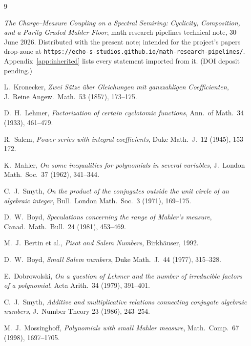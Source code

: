 \documentclass[11pt]{article}
\theoremstyle{plain}
\theoremstyle{definition}
\theoremstyle{remark}
\begin{document}
\begin{thebibliography}{9}

 \emph{The Charge--Measure Coupling on a Spectral Semiring:
Cyclicity, Composition, and a Parity-Graded Mahler Floor},
math-research-pipelines technical note, 30 June 2026. Distributed with the
present note; intended for the project's papers drop-zone at
\texttt{https://echo-s-studios.github.io/math-research-pipelines/}.
Appendix~\ref{app:inherited} lists every statement imported from it. (DOI
deposit pending.)

 L.~Kronecker, \emph{Zwei S\"atze \"uber Gleichungen mit
ganzzahligen Coefficienten}, J.~Reine Angew.~Math.\ 53 (1857), 173--175.

 D.~H.~Lehmer, \emph{Factorization of certain cyclotomic
functions}, Ann.\ of Math.\ 34 (1933), 461--479.

 R.~Salem, \emph{Power series with integral coefficients},
Duke Math.~J.\ 12 (1945), 153--172.

 K.~Mahler, \emph{On some inequalities for polynomials in
several variables}, J.~London Math.~Soc.\ 37 (1962), 341--344.

 C.~J.~Smyth, \emph{On the product of the conjugates outside the
unit circle of an algebraic integer}, Bull.~London Math.~Soc.\ 3 (1971),
169--175.

 D.~W.~Boyd, \emph{Speculations concerning the range of Mahler's
measure}, Canad.~Math.~Bull.\ 24 (1981), 453--469.

 M.~J.~Bertin et al., \emph{Pisot and Salem Numbers},
Birkh\"auser, 1992.

 D.~W.~Boyd, \emph{Small Salem numbers}, Duke Math.~J.\
44 (1977), 315--328.

 E.~Dobrowolski, \emph{On a question of Lehmer and the
number of irreducible factors of a polynomial}, Acta Arith.\ 34 (1979),
391--401.

 C.~J.~Smyth, \emph{Additive and multiplicative
relations connecting conjugate algebraic numbers}, J.~Number Theory 23
(1986), 243--254.

 M.~J.~Mossinghoff, \emph{Polynomials with small
Mahler measure}, Math.~Comp.\ 67 (1998), 1697--1705.

\end{thebibliography}
\end{document}
